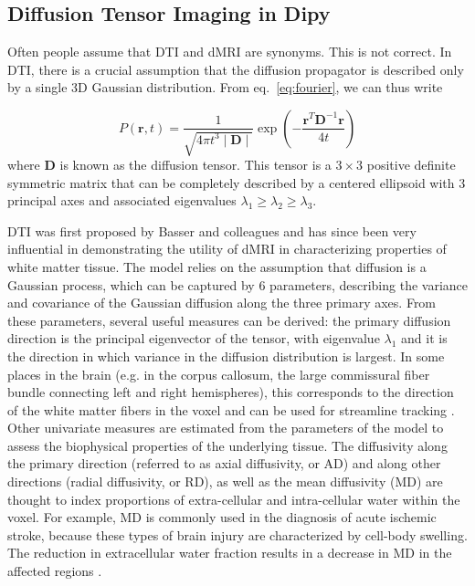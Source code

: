 \documentclass{bioinfo}
\begin{document}
\subsection{Diffusion Tensor Imaging in Dipy}\label{dti}

Often people assume that DTI and dMRI are synonyms. This is not correct. In
DTI, there is a crucial assumption that the diffusion propagator is
described only by a single 3D Gaussian distribution. From
eq.~\ref{eq:fourier}, we can thus write

\begin{equation}
P(\mathbf{r},t)=\frac{1}{\sqrt{4\pi t^{3}\mid\mathbf{D}\mid}}\exp(-\frac{\mathbf{r}^{T}\mathbf{D}^{-1}\mathbf{r}}{4t})
\end{equation}
\noindent where $\mathbf{D}$ is known as the diffusion tensor. This tensor is a
$3\times3$ positive definite symmetric matrix that can be completely described by a
centered ellipsoid with 3 principal axes and associated eigenvalues
$\lambda_{1}\ge\lambda_{2}\ge\lambda_{3}$.

DTI was first proposed by Basser and colleagues
\citep{basser-mattiello-etal:94} and has since been very influential in
demonstrating the utility of dMRI in characterizing properties  of
white matter tissue. The model relies on the assumption that diffusion is a
Gaussian process, which can be captured by 6 parameters, describing
the variance and covariance of
the Gaussian diffusion along the three primary axes. From these
parameters, several useful measures
can be derived: the primary diffusion direction is the principal eigenvector of
the tensor, with eigenvalue $\lambda_{1}$ and it is the direction in which variance in the
diffusion distribution is largest. In some places in the brain (e.g. in the
corpus callosum, the large commissural fiber bundle connecting left
and right hemispheres), this corresponds to the
direction of the white
matter fibers in the voxel and can be used for streamline tracking
\citep{conturo-lori-etal:99, Mori1999, Basser2000}. Other univariate measures
are estimated from the parameters of the model to assess the biophysical
properties of the underlying tissue. The diffusivity along the primary
direction (referred to as axial diffusivity, or AD) and along other directions
(radial diffusivity, or RD), as well as the mean diffusivity (MD) are thought
to index proportions of extra-cellular and intra-cellular water within the
voxel. For example, MD is commonly used in the diagnosis of acute ischemic
stroke, because these types of brain injury are characterized by cell-body
swelling. The reduction in extracellular water fraction results in a decrease
in MD in the affected regions \citep{Maas2005}.
\end{document}
